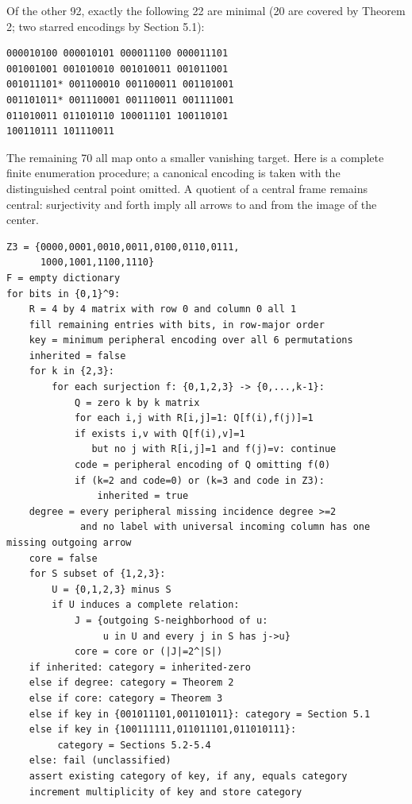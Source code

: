 \documentclass[11pt]{article}
\begin{document}
Of the other 92, exactly the following 22 are minimal (20 are covered by Theorem 2; two starred encodings by Section 5.1):

\begin{Verbatim}[fontsize=\small]
000010100 000010101 000011100 000011101
001001001 001010010 001010011 001011001
001011101* 001100010 001100011 001101001
001101011* 001110001 001110011 001111001
011010011 011010110 100011101 100110101
100110111 101110011
\end{Verbatim}

The remaining 70 all map onto a smaller vanishing target. Here is a complete finite enumeration procedure; a canonical encoding is taken with the distinguished central point omitted. A quotient of a central frame remains central: surjectivity and forth imply all arrows to and from the image of the center.

\begin{Verbatim}[fontsize=\footnotesize,breaklines=true]
Z3 = {0000,0001,0010,0011,0100,0110,0111,
      1000,1001,1100,1110}
F = empty dictionary
for bits in {0,1}^9:
    R = 4 by 4 matrix with row 0 and column 0 all 1
    fill remaining entries with bits, in row-major order
    key = minimum peripheral encoding over all 6 permutations
    inherited = false
    for k in {2,3}:
        for each surjection f: {0,1,2,3} -> {0,...,k-1}:
            Q = zero k by k matrix
            for each i,j with R[i,j]=1: Q[f(i),f(j)]=1
            if exists i,v with Q[f(i),v]=1
               but no j with R[i,j]=1 and f(j)=v: continue
            code = peripheral encoding of Q omitting f(0)
            if (k=2 and code=0) or (k=3 and code in Z3):
                inherited = true
    degree = every peripheral missing incidence degree >=2
             and no label with universal incoming column has one missing outgoing arrow
    core = false
    for S subset of {1,2,3}:
        U = {0,1,2,3} minus S
        if U induces a complete relation:
            J = {outgoing S-neighborhood of u:
                 u in U and every j in S has j->u}
            core = core or (|J|=2^|S|)
    if inherited: category = inherited-zero
    else if degree: category = Theorem 2
    else if core: category = Theorem 3
    else if key in {001011101,001101011}: category = Section 5.1
    else if key in {100111111,011011101,011010111}:
         category = Sections 5.2-5.4
    else: fail (unclassified)
    assert existing category of key, if any, equals category
    increment multiplicity of key and store category
\end{Verbatim}
\end{document}
